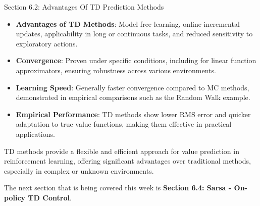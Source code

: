 \begin{notes}{Section 6.2: Advantages Of TD Prediction Methods}
\begin{highlight}
    \end{highlight}
    
    \begin{highlight}
    
        \begin{itemize}
            \item \textbf{Advantages of TD Methods}: Model-free learning, online incremental updates, applicability in long or continuous tasks, and reduced sensitivity to exploratory actions.
            \item \textbf{Convergence}: Proven under specific conditions, including for linear function approximators, ensuring robustness across various environments.
            \item \textbf{Learning Speed}: Generally faster convergence compared to MC methods, demonstrated in empirical comparisons such as the Random Walk example.
            \item \textbf{Empirical Performance}: TD methods show lower RMS error and quicker adaptation to true value functions, making them effective in practical applications.
        \end{itemize}
    
        TD methods provide a flexible and efficient approach for value prediction in reinforcement learning, offering significant advantages over traditional methods, especially in complex or unknown environments.
    
    \end{highlight}
\end{notes}

The next section that is being covered this week is \textbf{Section 6.4: Sarsa - On-policy TD Control}.

